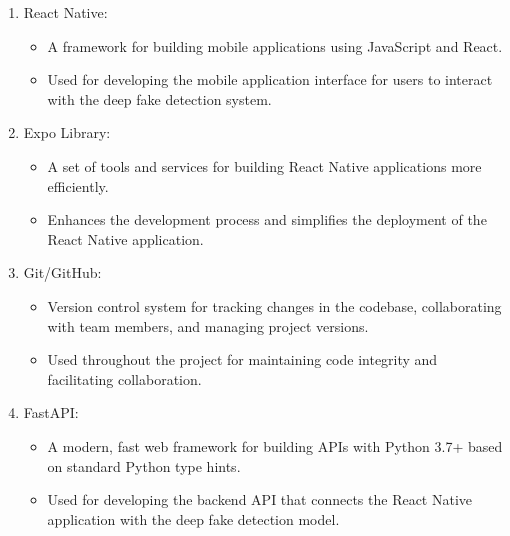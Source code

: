 \begin{enumerate}
        \item React Native:
            \begin{itemize}
                \item A framework for building mobile applications using JavaScript and React.
                \item Used for developing the mobile application interface for users to interact with the deep fake detection system.
            \end{itemize}
        
        \item Expo Library:
            \begin{itemize}
                \item A set of tools and services for building React Native applications more efficiently.
                \item Enhances the development process and simplifies the deployment of the React Native application.
            \end{itemize}
        
        \item Git/GitHub:
            \begin{itemize}
                \item Version control system for tracking changes in the codebase, collaborating with team members, and managing project versions.
                \item Used throughout the project for maintaining code integrity and facilitating collaboration.
            \end{itemize}
        
        \item FastAPI:
            \begin{itemize}
                \item A modern, fast web framework for building APIs with Python 3.7+ based on standard Python type hints.
                \item Used for developing the backend API that connects the React Native application with the deep fake detection model.
            \end{itemize}
    
\end{enumerate}
\newpage